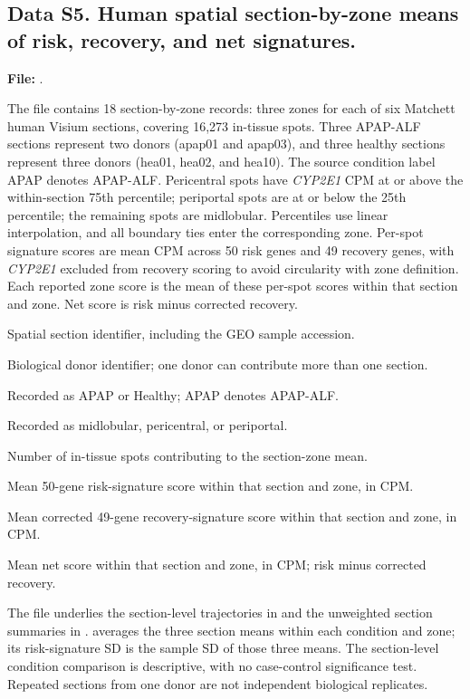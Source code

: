 \subsection*{Data S5. Human spatial section-by-zone means of risk, recovery, and net signatures.}
\label{data:S5}
\noindent\textbf{File:} .\par\smallskip
\noindent The file contains 18 section-by-zone records: three zones for each of six Matchett human Visium sections, covering 16,273 in-tissue spots. Three APAP-ALF sections represent two donors (apap01 and apap03), and three healthy sections represent three donors (hea01, hea02, and hea10). The source condition label APAP denotes APAP-ALF. Pericentral spots have \textit{CYP2E1} CPM at or above the within-section 75th percentile; periportal spots are at or below the 25th percentile; the remaining spots are midlobular. Percentiles use linear interpolation, and all boundary ties enter the corresponding zone. Per-spot signature scores are mean CPM across 50 risk genes and 49 recovery genes, with \textit{CYP2E1} excluded from recovery scoring to avoid circularity with zone definition. Each reported zone score is the mean of these per-spot scores within that section and zone. Net score is risk minus corrected recovery.\par\smallskip
\begin{description}
\setlength{\itemsep}{1pt}\setlength{\parsep}{0pt}
\item[\texttt{sample}] Spatial section identifier, including the GEO sample accession.
\item[\texttt{donor}] Biological donor identifier; one donor can contribute more than one section.
\item[\texttt{condition}] Recorded as APAP or Healthy; APAP denotes APAP-ALF.
\item[\texttt{zone}] Recorded as midlobular, pericentral, or periportal.
\item[\texttt{N\_spots}] Number of in-tissue spots contributing to the section-zone mean.
\item[\texttt{Mean\_risk\_signature}] Mean 50-gene risk-signature score within that section and zone, in CPM.
\item[\texttt{Mean\_recovery\_signature}] Mean corrected 49-gene recovery-signature score within that section and zone, in CPM.
\item[\texttt{Mean\_net\_signature}] Mean net score within that section and zone, in CPM; risk minus corrected recovery.
\end{description}
\noindent The file underlies the section-level trajectories in  and the unweighted section summaries in .  averages the three section means within each condition and zone; its risk-signature SD is the sample SD of those three means. The section-level condition comparison is descriptive, with no case-control significance test. Repeated sections from one donor are not independent biological replicates.\par\medskip


